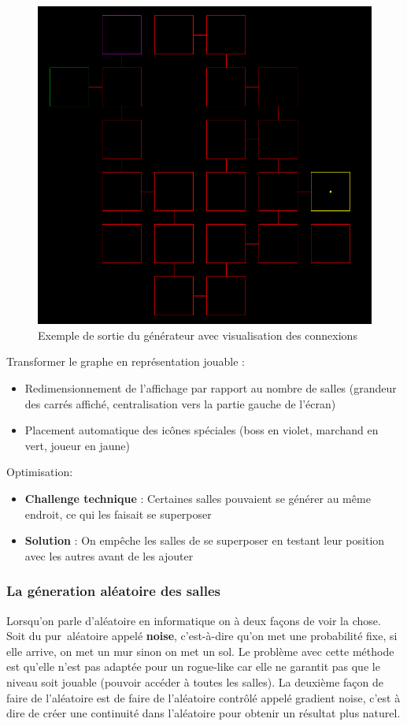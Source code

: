 \documentclass[a4paper,11pt]{article}
\begin{document}
\begin{figure}[h]
\centering
\includegraphics[width=0.4\linewidth]{./img/map_generation.png}
\caption{Exemple de sortie du générateur avec visualisation des connexions}
\label{fig:map_gen32}
\end{figure}
\bigskip
Transformer le graphe en représentation jouable :
\begin{itemize}
    \item Redimensionnement de l'affichage par rapport  au nombre de salles (grandeur des carrés affiché, centralisation vers la partie gauche de l'écran)
    \item  Placement automatique des icônes spéciales (boss en violet, marchand en vert, joueur en jaune)
\end{itemize}
\bigskip
Optimisation:
\begin{itemize}
\item \textbf{Challenge technique} : Certaines salles pouvaient se générer au même endroit, ce qui les faisait se superposer
\item \textbf{Solution} : On empêche les salles de se superposer en testant leur position avec les autres avant de les ajouter
\end{itemize}


\subsubsection{La géneration aléatoire des salles}
Lorsqu'on parle d'aléatoire en informatique on à deux façons de voir la chose. Soit du \guillemotleft pur\guillemotright \ aléatoire appelé \textbf{noise}, c'est-à-dire qu'on met une probabilité fixe, si elle arrive, on met un mur sinon on met un sol. Le problème avec cette méthode est qu'elle n'est pas adaptée pour un rogue-like car elle ne garantit pas que le niveau soit jouable (pouvoir accéder à toutes les salles). 
La deuxième façon de faire de l'aléatoire est de faire de l'aléatoire contrôlé appelé gradient noise, c'est à dire de créer une continuité dans l'aléatoire pour obtenir un résultat plus naturel.\\\\
\end{document}
